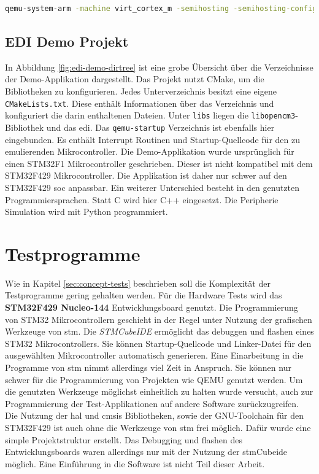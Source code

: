 \begin{minipage}{\linewidth}
\begin{lstlisting}[language=sh,numbers=none,
                label={lst:impl-qemu-edi-call},
                caption=Exemplarischer QEMU-EDI Aufruf mit EDI-Device-Group]
qemu-system-arm -machine virt_cortex_m -semihosting -semihosting-config enable=on,target=native -monitor null -kernel build/app/qemu_runner/app_qemu.elf -device kp-edi-group
\end{lstlisting}
\end{minipage}

\subsection{EDI Demo Projekt}

In Abbildung \ref{fig:edi-demo-dirtree} ist eine grobe Übersicht über die
Verzeichnisse der Demo-Applikation dargestellt.
Das Projekt nutzt CMake, um die Bibliotheken zu konfigurieren.
Jedes Unterverzeichnis besitzt eine eigene \texttt{CMakeLists.txt}.
Diese enthält Informationen über das Verzeichnis und konfiguriert die darin
enthaltenen Dateien.
Unter \texttt{libs} liegen die \texttt{libopencm3}-Bibliothek und das
\acs{edi}.
Das \texttt{qemu-startup} Verzeichnis ist ebenfalls hier eingebunden.
Es enthält Interrupt Routinen und Startup-Quellcode für den zu emulierenden
Mikrocontroller.
Die Demo-Applikation wurde ursprünglich für einen STM32F1 Mikrocontroller
geschrieben.
Dieser ist nicht kompatibel mit dem STM32F429 Mikrocontroller.
Die Applikation ist daher nur schwer auf den STM32F429 \ac{soc} anpassbar.
Ein weiterer Unterschied besteht in den genutzten Programmiersprachen.
Statt C wird hier C++ eingesetzt.
Die Peripherie Simulation wird mit Python programmiert.

\section{Testprogramme}
\label{sec:impl-tests}

Wie in Kapitel \ref{sec:concept-tests} beschrieben soll die Komplexität der
Testprogramme gering gehalten werden.
Für die Hardware Tests wird das \textbf{STM32F429 Nucleo-144} Entwicklungsboard
genutzt.
Die Programmierung von STM32 Mikrocontrollern geschieht in der Regel unter
Nutzung der grafischen Werkzeuge von \ac{stm}.
Die \textit{STMCubeIDE} ermöglicht das debuggen und flashen
eines STM32 Mikrocontrollers.
Sie können Startup-Quellcode und Linker-Datei für den ausgewählten
Mikrocontroller automatisch generieren.
Eine Einarbeitung in die Programme von \ac{stm} nimmt allerdings viel Zeit in
Anspruch.
Sie können nur schwer für die Programmierung von Projekten wie QEMU genutzt
werden.
Um die genutzten Werkzeuge möglichst einheitlich zu halten wurde versucht, auch
zur Programmierung der Test-Applikationen auf andere Software zurückzugreifen.
Die Nutzung der \ac{hal} und \ac{cmsis} Bibliotheken, sowie der GNU-Toolchain
für den STM32F429 ist auch ohne die Werkzeuge von \ac{stm} frei möglich.
Dafür wurde eine simple Projektstruktur erstellt.
Das Debugging und flashen des Entwicklungsboards waren allerdings nur mit der
Nutzung der \ac{stm}Cube\acs{ide} möglich.
Eine Einführung in die Software ist nicht Teil dieser Arbeit.

